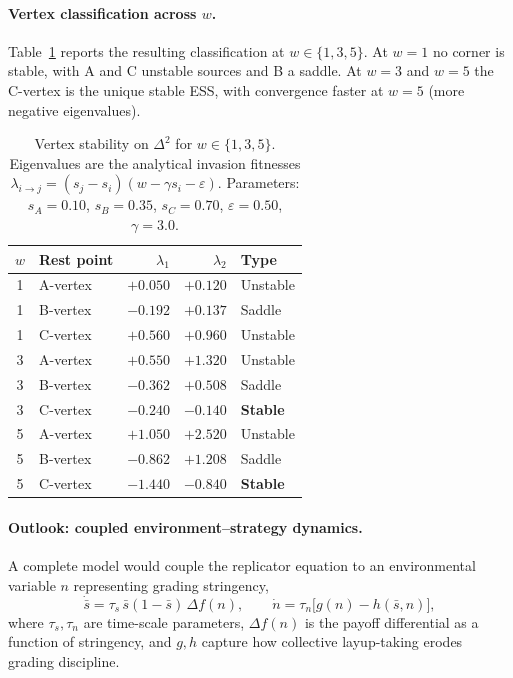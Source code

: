 \documentclass[12pt]{article}
\begin{document}
\paragraph{Vertex classification across $w$.}
Table~\ref{tab:stability} reports the resulting classification at
$w \in \{1, 3, 5\}$. At $w = 1$ no corner is stable, with A and C
unstable sources and B a saddle. At $w = 3$ and $w = 5$ the C-vertex is
the unique stable ESS, with convergence faster at $w = 5$ (more
negative eigenvalues).

\begin{table}[H]
\centering
\caption{Vertex stability on $\Delta^2$ for $w \in \{1, 3, 5\}$.
Eigenvalues are the analytical invasion fitnesses
$\lambda_{i \to j} = (s_j - s_i)(w - \gamma s_i - \varepsilon)$.
Parameters: $s_A = 0.10$, $s_B = 0.35$, $s_C = 0.70$,
$\varepsilon = 0.50$, $\gamma = 3.0$.}
\label{tab:stability}
\small
\begin{tabular}{clrrl}
\toprule
$w$ & Rest point & $\lambda_1$ & $\lambda_2$ & Type \\
\midrule
1 & A-vertex & $+0.050$ & $+0.120$ & Unstable \\
1 & B-vertex & $-0.192$ & $+0.137$ & Saddle \\
1 & C-vertex & $+0.560$ & $+0.960$ & Unstable \\
\midrule
3 & A-vertex & $+0.550$ & $+1.320$ & Unstable \\
3 & B-vertex & $-0.362$ & $+0.508$ & Saddle \\
3 & C-vertex & $-0.240$ & $-0.140$ & \textbf{Stable} \\
\midrule
5 & A-vertex & $+1.050$ & $+2.520$ & Unstable \\
5 & B-vertex & $-0.862$ & $+1.208$ & Saddle \\
5 & C-vertex & $-1.440$ & $-0.840$ & \textbf{Stable} \\
\bottomrule
\end{tabular}
\end{table}

\paragraph{Outlook: coupled environment--strategy dynamics.}
A complete model would couple the replicator equation to an
environmental variable $n$ representing grading stringency,
\begin{equation}
  \dot{\bar s} = \tau_s\, \bar s (1 - \bar s)\,\Delta f(n),
  \qquad
  \dot n = \tau_n\bigl[g(n) - h(\bar s, n)\bigr],
\end{equation}
where $\tau_s, \tau_n$ are time-scale parameters, $\Delta f(n)$ is the
payoff differential as a function of stringency, and $g, h$ capture how
collective layup-taking erodes grading discipline.
\end{document}
